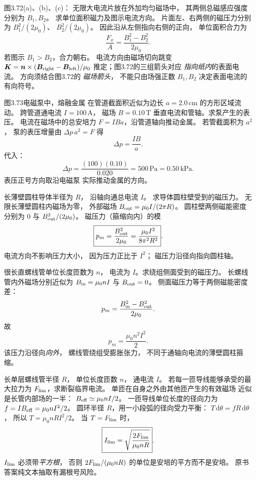 图3.72(a)、(b)、(c)：
无限大电流片放在外加均匀磁场中，
其两侧总磁感应强度分别为
$B_1,B_2$。
求单位面积磁力及图示电流方向。
\exsolution
片面左、右两侧的磁压力分别为
$B_1^2/(2\mu_0)$、
$B_2^2/(2\mu_0)$。
因此沿从左侧指向右侧的正向，
单位面积合力为
\[
\boxed{\frac{F_x}{A}=
\frac{B_1^2-B_2^2}{2\mu_0}}.
\]
若图示 $B_1>B_2$，合力朝右。
电流方向由磁场切向跳变
$\bm K=\bm n\times
(\bm B_{\rm right}-\bm B_{\rm left})/\mu_0$
推定；图3.72的三组箭头对应
\emph{指向纸内}的表面电流。
\excheck 方向须结合图3.72的
\emph{磁场箭头}，
不能只由场强正数 $B_1,B_2$
决定表面电流的有向符号。

图3.73电磁泵中，熔融金属
在管道截面积近似为边长
$a=2.0\,\mathrm{cm}$ 的方形区域流动。
跨管道通电流 $I=100\,\mathrm A$，
磁场 $B=0.10\,\mathrm T$
垂直电流和管轴。求泵产生的表压。
\exsolution
电流在磁场中的总安培力
$F=IBa$，沿管道轴向推动金属。
若管截面积为 $a^2$，
泵的表压增量由
$\Delta p\,a^2=F$ 得
\[
\boxed{\Delta p=\frac{IB}{a}}.
\]
代入：
\[
\boxed{\Delta p=
\frac{(100)(0.10)}{0.020}
=500\,\mathrm{Pa}=0.50\,\mathrm{kPa}}.
\]
\excheck 表压正号方向取沿电磁泵
实际推动金属的方向。

长薄壁圆柱导体半径为 $R$，
沿轴向通总电流 $I$。
求导体圆柱壁受到的磁压力。
\exsolution
无限长薄壁圆柱内磁场为零，
外部磁场
$B_{\rm out}=\mu_0I/(2\pi R)$。
圆柱壁两侧磁能密度分别为
0 与
$B_{\rm out}^2/(2\mu_0)$。
磁压力（箍缩向内）的模
\[
\boxed{p_m=\frac{B_{\rm out}^2}{2\mu_0}
=\frac{\mu_0I^2}{8\pi^2R^2}}.
\]
\excheck 电流方向不影响压力大小，
因为压力正比于 $I^2$；
磁压力沿径向指向圆柱轴。

很长直螺线管单位长度匝数为 $n$，
电流为 $I$。求绕组侧面受到的磁压力。
\exsolution
长螺线管内外磁场分别近似为
$B_{\rm in}=\mu_0nI$ 与 $B_{\rm out}=0$。
侧面磁压力等于两侧磁能密度差：
\[
p_m=\frac{B_{\rm in}^2-B_{\rm out}^2}{2\mu_0}.
\]
故
\[
\boxed{p_m=\frac{\mu_0n^2I^2}{2}}.
\]
\excheck 该压力沿径向\emph{向外}，
螺线管绕组受膨胀张力，
不同于通轴向电流的薄壁圆柱箍缩。

长单层螺线管半径 $R$，
单位长度匝数 $n$，
通电流 $I$。
若每一匝导线能够承受的最大拉力为
$F_{\rm lim}$，求断裂临界电流。
\exsolution
单匝在自身之外由其他匝产生的有效磁场
近似是长管内部场的一半：
$B_{\rm eff}\simeq\mu_0nI/2$。
一匝导线单位长度的径向力为
$f=IB_{\rm eff}=\mu_0nI^2/2$。
圆环半径 $R$，用一小段弧的径向受力平衡：
$T\,\mathrm d\theta=fR\,\mathrm d\theta$，
所以
$T=\mu_0nRI^2/2$。
当 $T=F_{\rm lim}$ 时，
\[
\boxed{I_{\rm lim}=
\sqrt{\frac{2F_{\rm lim}}{\mu_0nR}}}.
\]
\excheck $I_{\rm lim}$ 必须带\emph{平方根}，
否则 $2F_{\rm lim}/(\mu_0nR)$
的单位是安培的平方而不是安培。
原书答案纯文本抽取有漏根号风险。

